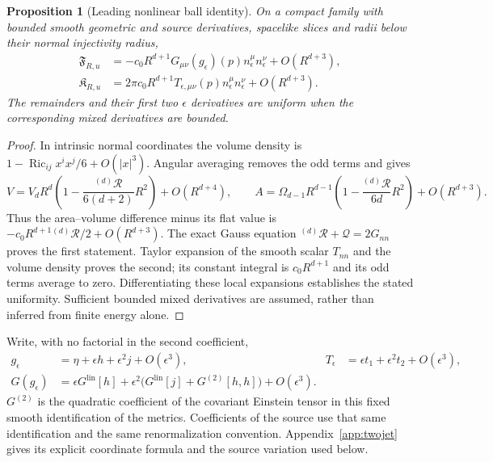 \documentclass[12pt]{article}
\newtheorem{proposition}[theorem]{Proposition}
\theoremstyle{definition}
\theoremstyle{remark}
\newcommand{\Glin}{G^{\mathrm{lin}}}
\begin{document}
\begin{proposition}[Leading nonlinear ball identity]
\label{prop:nonlinear-leading}
On a compact family with bounded smooth geometric and source derivatives,
spacelike slices and radii below their normal injectivity radius,
\begin{align}
 \mathfrak F_{R,u}&=-c_0R^{d+1}G_{\mu\nu}(g_\epsilon)(p)
                         n_\epsilon^\mu n_\epsilon^\nu+O(R^{d+3}),\\
 \mathfrak K_{R,u}&=2\pi c_0R^{d+1}T_{\epsilon,\mu\nu}(p)
                         n_\epsilon^\mu n_\epsilon^\nu+O(R^{d+3}).
 \label{eq:nonlinear-leading}
\end{align}
The remainders and their first two $\epsilon$ derivatives are uniform
when the corresponding mixed derivatives are bounded.
\end{proposition}
\begin{proof}
In intrinsic normal coordinates the volume density is
$1-\operatorname{Ric}_{ij}x^ix^j/6+O(|x|^3)$. Angular averaging removes
the odd terms and gives
\[
 V=V_dR^d\left(1-\frac{{}^{(d)}\!\mathcal R}{6(d+2)}R^2\right)
       +O(R^{d+4}),\qquad
 A=\Omega_{d-1}R^{d-1}\left(1-\frac{{}^{(d)}\!\mathcal R}{6d}R^2\right)
       +O(R^{d+3}).
\]
Thus the area--volume difference minus its flat value is
$-c_0R^{d+1}{}^{(d)}\!\mathcal R/2+O(R^{d+3})$.
The exact Gauss equation
$ {}^{(d)}\!\mathcal R+\mathcal Q=2G_{nn}$ proves the first statement.
Taylor expansion of the smooth scalar $T_{nn}$ and the volume density
proves the second; its constant integral is $c_0R^{d+1}$ and its odd
terms average to zero. Differentiating these local expansions establishes
the stated uniformity. Sufficient bounded mixed derivatives are assumed,
rather than inferred from finite energy alone.
\end{proof}

Write, with no factorial in the second coefficient,
\begin{align}
 g_\epsilon&=\eta+\epsilon h+\epsilon^2j+O(\epsilon^3),
 & T_\epsilon&=\epsilon t_1+\epsilon^2t_2+O(\epsilon^3),\\
 G(g_\epsilon)&=\epsilon\Glin[h]
       +\epsilon^2\bigl(\Glin[j]+G^{(2)}[h,h]\bigr)+O(\epsilon^3).
 \label{eq:twojets}
\end{align}
$G^{(2)}$ is the quadratic coefficient of the covariant Einstein tensor
in this fixed smooth identification of the metrics. Coefficients of the
source use that same identification and the same renormalization convention.
Appendix~\ref{app:twojet} gives its explicit coordinate formula and the
source variation used below.
\end{document}
